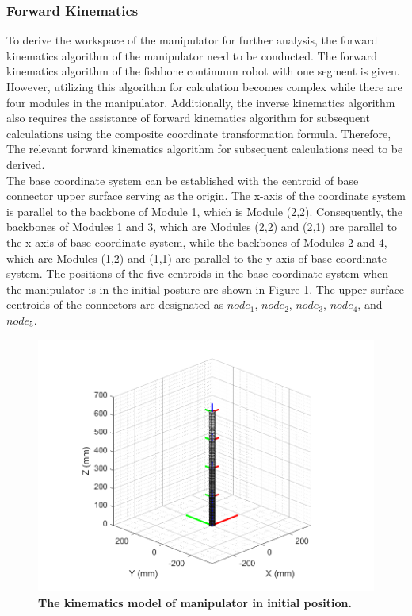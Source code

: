 \subsubsection{Forward Kinematics} %
To derive the workspace of the manipulator for further analysis, the forward kinematics algorithm of the manipulator 
need to be conducted. The forward kinematics algorithm of the fishbone continuum robot\cite{fishboneCR} with one 
segment is given. However, utilizing this algorithm for calculation becomes complex while there are four modules in 
the manipulator. Additionally, the inverse kinematics algorithm also requires the assistance of forward kinematics 
algorithm for subsequent calculations using the composite coordinate transformation formula. Therefore, The relevant 
forward kinematics algorithm for subsequent calculations need to be derived. \\
The base coordinate system can be established with the centroid of base connector upper surface serving as the origin. 
The x-axis of the coordinate system is parallel to the backbone of Module 1, which is Module (2,2). Consequently, 
the backbones of Modules 1 and 3, which are Modules (2,2) and (2,1) are parallel to the x-axis of base coordinate 
system, while the backbones of Modules 2 and 4, which are Modules (1,2) and (1,1) are parallel to the y-axis of base 
coordinate system. The positions of the five centroids in the base coordinate system when the manipulator is in the 
initial posture are shown in Figure \ref{fig:kinematics model 0_0_0_0}. The upper surface centroids of the connectors 
are designated as $node_1$, $node_2$, $node_3$, $node_4$, and $node_5$. \\
\begin{figure}[H] %
    \centering %
    \captionsetup{labelsep=colon}
    \includegraphics[width=1.0\textwidth]{Image/MATLAB/manipulator_0_0_0_0.png} 
    \caption[The kinematics model of manipulator in the initial position]
    {\centering \textbf{The kinematics model of manipulator in initial position.}}
    \label{fig:kinematics model 0_0_0_0}
\end{figure}

